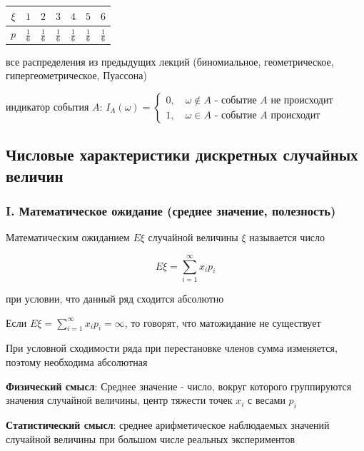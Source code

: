 \documentclass[12pt]{article}
\begin{document}
    \begin{tabular}{c|c|c|c|c|c|c}
        $\xi$ & $1$           & $2$           & $3$           & $4$           & $5$           & $6$           \\
        \hline
        $p$   & $\frac{1}{6}$ & $\frac{1}{6}$ & $\frac{1}{6}$ & $\frac{1}{6}$ & $\frac{1}{6}$ & $\frac{1}{6}$
    \end{tabular}


    \smallvspace

     все распределения из предыдущих лекций (биномиальное, геометрическое, гипергеометрическое, Пуассона)

     индикатор события $A$: $I_A (\omega) = \begin{cases}
                                                        0, \quad \omega \notin A \text{ - событие } A \text{ не происходит} \\ 1, \quad \omega \in A \text{ - событие } A \text{ происходит}
    \end{cases}$

    \subsection{Числовые характеристики дискретных случайных величин}

    \subsubsection{I. Математическое ожидание (среднее значение, полезность)}

    \Defs Математическим ожиданием $E\xi$ случайной величины $\xi$ называется число

    \[ E\xi = \sum_{i = 1}^\infty x_i p_i \]

    при условии, что данный ряд сходится абсолютно

    \Nota Если $E\xi = \sum_{i = 1}^\infty x_i p_i = \infty$, то говорят, что матожидание не существует

    При условной сходимости ряда при перестановке членов сумма изменяется, поэтому необходима абсолютная

    \textbf{Физический смысл}: Среднее значение - число, вокруг которого группируются значения случайной величины, центр тяжести точек $x_i$ с весами $p_i$

    \textbf{Статистический смысл}: среднее арифметическое наблюдаемых значений случайной величины при
    большом числе реальных экспериментов
\end{document}
